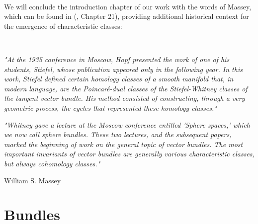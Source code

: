 \documentclass[12pt,oneside]{book}
\begin{document}
    \
    
    We will conclude the introduction chapter of our work with the words of Massey, which can be found 
    in (\cite{james}, Chapter 21), providing additional historical context for the emergence of 
    characteristic classes:

    \

        \begin{center}
            \begin{minipage}{12cm}
                \textit{"At the 1935 conference in Moscow, Hopf presented the work of one of his students, 
                Stiefel, whose publication appeared only in the following year. In this work, Stiefel 
                defined certain homology classes of a smooth manifold that, in modern language, are the 
                Poincaré-dual classes of the Stiefel-Whitney classes of the tangent vector bundle. His 
                method consisted of constructing, through a very geometric process, the cycles that 
                represented these homology classes."}
            \end{minipage}
        \end{center}
    
        \vspace{0.5cm}
    
        \begin{center}
            \begin{minipage}{12cm}
                \textit{"Whitney gave a lecture at the Moscow conference entitled 'Sphere spaces,' which we 
                now call sphere bundles. These two lectures, and the subsequent papers, marked the beginning 
                of work on the general topic of vector bundles. The most important invariants of vector 
                bundles are generally various characteristic classes, but always cohomology classes."}
                \begin{flushright}
                    William S. Massey
                \end{flushright}
            \end{minipage}
        \end{center}

    



    \chapter{Bundles}\label{cap_fib}
    \thispagestyle{empty}
\end{document}
